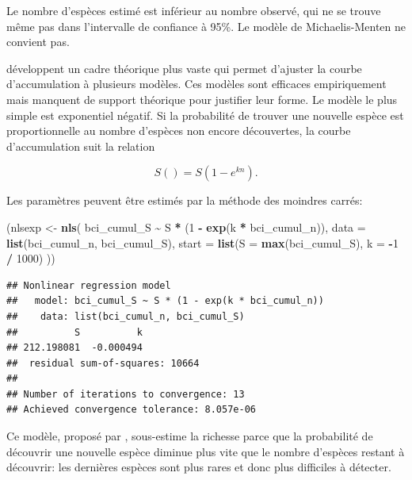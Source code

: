 \documentclass[
  11pt,
  american,
  a4paper,
  extrafontsizes,onecolumn,openright
  ]{memoir}
\newenvironment{Shaded}{\begin{snugshade}}{\end{snugshade}}
\newcommand{\AttributeTok}[1]{\textcolor[rgb]{0.13,0.29,0.53}{#1}}
\newcommand{\DecValTok}[1]{\textcolor[rgb]{0.00,0.00,0.81}{#1}}
\newcommand{\FunctionTok}[1]{\textcolor[rgb]{0.13,0.29,0.53}{\textbf{#1}}}
\newcommand{\NormalTok}[1]{#1}
\newcommand{\OtherTok}[1]{\textcolor[rgb]{0.56,0.35,0.01}{#1}}
\newcommand{\SpecialCharTok}[1]{\textcolor[rgb]{0.81,0.36,0.00}{\textbf{#1}}}
\begin{document}
\normalsize

Le nombre d'espèces estimé est inférieur au nombre observé, qui ne se trouve même pas dans l'intervalle de confiance à 95\%.
Le modèle de Michaelis-Menten ne convient pas.

\textcite{Soberon1993} développent un cadre théorique plus vaste qui permet d'ajuster la courbe d'accumulation à plusieurs modèles.
Ces modèles sont efficaces empiriquement mais manquent de support théorique pour justifier leur forme.
Le modèle le plus simple est exponentiel négatif.
Si la probabilité de trouver une nouvelle espèce est proportionnelle au nombre d'espèces non encore découvertes, la courbe d'accumulation suit la relation

\begin{equation} 
  \label{eq:Soberon1993a}
  S() = S \left( 1 - e^{kn} \right).
\end{equation}

Les paramètres peuvent être estimés par la méthode des moindres carrés:

\scriptsize

\begin{Shaded}
\begin{Highlighting}[]
\NormalTok{(nlsexp }\OtherTok{\textless{}{-}} \FunctionTok{nls}\NormalTok{(}
\NormalTok{  bci\_cumul\_S }\SpecialCharTok{\textasciitilde{}}\NormalTok{ S }\SpecialCharTok{*}\NormalTok{ (}\DecValTok{1} \SpecialCharTok{{-}} \FunctionTok{exp}\NormalTok{(k }\SpecialCharTok{*}\NormalTok{ bci\_cumul\_n)), }
  \AttributeTok{data =} \FunctionTok{list}\NormalTok{(bci\_cumul\_n, bci\_cumul\_S), }
  \AttributeTok{start =} \FunctionTok{list}\NormalTok{(}\AttributeTok{S =} \FunctionTok{max}\NormalTok{(bci\_cumul\_S), }\AttributeTok{k =} \SpecialCharTok{{-}}\DecValTok{1} \SpecialCharTok{/} \DecValTok{1000}\NormalTok{)}
\NormalTok{))}
\end{Highlighting}
\end{Shaded}

\begin{verbatim}
## Nonlinear regression model
##   model: bci_cumul_S ~ S * (1 - exp(k * bci_cumul_n))
##    data: list(bci_cumul_n, bci_cumul_S)
##          S          k 
## 212.198081  -0.000494 
##  residual sum-of-squares: 10664
## 
## Number of iterations to convergence: 13 
## Achieved convergence tolerance: 8.057e-06
\end{verbatim}

\normalsize

Ce modèle, proposé par \textcite{Holdridge1971}, sous-estime la richesse parce que la probabilité de découvrir une nouvelle espèce diminue plus vite que le nombre d'espèces restant à découvrir: les dernières espèces sont plus rares et donc plus difficiles à détecter.
\end{document}
